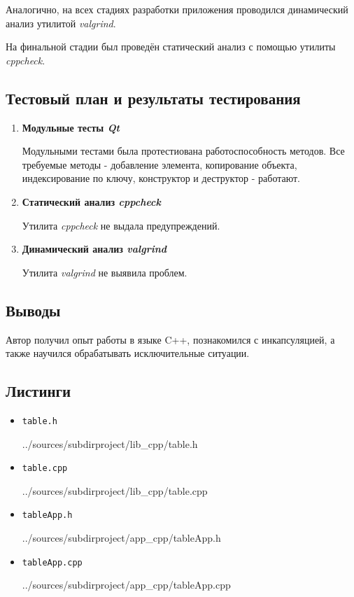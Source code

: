 \documentclass[12pt,a4paper]{report}
\begin{document}
Аналогично, на всех стадиях разработки приложения проводился динамический анализ утилитой \textit{valgrind}.

На финальной стадии был проведён статический анализ с помощью утилиты \textit{cppcheck}.
\subsection{Тестовый план и результаты тестирования}
\hspace{\parindent}
\begin{enumerate}
\item \textbf{Модульные тесты \textit{Qt}}

Модульными тестами была протестиована работоспособность методов. Все требуемые методы - добавление элемента, копирование объекта, индексирование по ключу, конструктор и деструктор - работают.
\item \textbf{Статический анализ \textit{cppcheck}}

Утилита \textit{cppcheck} не выдала предупреждений.

\item \textbf{Динамический анализ \textit{valgrind}}

Утилита \textit{valgrind} не выявила проблем.
\end{enumerate}
\subsection{Выводы}
\hspace{\parindent}
Автор получил опыт работы в языке C++, познакомился с инкапсуляцией, а также научился обрабатывать исключительные ситуации.
\subsection*{Листинги}
\begin{itemize}
\item[] \verb-table.h-

{../sources/subdirproject/lib_cpp/table.h}

\item[] \verb-table.cpp-

{../sources/subdirproject/lib_cpp/table.cpp}

\item[] \verb-tableApp.h-

{../sources/subdirproject/app_cpp/tableApp.h}

\item[] \verb-tableApp.cpp-

{../sources/subdirproject/app_cpp/tableApp.cpp}
\end{itemize}
\end{document}
